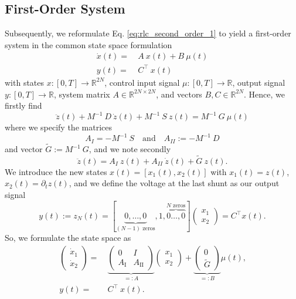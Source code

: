
\subsection{First-Order System}
Subsequently, we reformulate Eq. \eqref{eq:rlc_second_order_1} to yield a first-order system in the common state space formulation
\begin{align*}
	\dot{x}(t) =&~ A~ x(t) + B~\mu(t)\\
	y(t) =&~ C^\top~x(t)
\end{align*}
with states $x:[0,T]\rightarrow \mathbb{R}^{2N}$, control input signal $\mu:[0,T]\rightarrow \mathbb{R}$, output signal $y:[0,T]\rightarrow \mathbb{R}$, system matrix $A \in \mathbb{R}^{2N\times2N}$, and vectors $B, C \in \mathbb{R}^{2N}$. Hence, we firstly find
\begin{equation}
	\ddot{z}(t) + M^{-1}~D ~ \dot{z}(t) + M^{-1}~S ~ z(t) = M^{-1}~G ~ \mu(t)	 \label{eq:rlc_second_order_2}
\end{equation}
where we specify the matrices 
\begin{equation}
	A_{I} = -M^{-1}~S \quad \text{and} \quad A_{II} := -M^{-1}~D	\label{eq:first_order_submatrices}
\end{equation}
and vector $\tilde{G}:= M^{-1}~G$, and we note secondly 
\begin{equation*}
	\ddot{z}(t) = A_{I} ~ z(t)  + A_{II} ~ \dot{z}(t) + \tilde{G} ~ z(t) \text{.}
\end{equation*}
We introduce the new states $x(t) = \left[x_{1}(t),x_{2}(t)\right]$ with $x_{1}(t) = z(t)$, $x_{2}(t) = \partial_{t} z(t)$, and we define the voltage at the last shunt as our output signal 
\begin{equation}
	y(t) := z_{N}(t) = \left[\underbrace{0,\ldots,0}_{(N-1)\text{ zeros}},1,\overbrace{0\ldots,0}^{N \text{ zeros}}\right] 	\begin{pmatrix}
		{x}_{1} \\	
		{x}_{2}
	\end{pmatrix} = C^{\top} x(t) \text{.} 
\end{equation}
So, we formulate the state space as 
\begin{subequations}
\begin{align}
	\begin{pmatrix}
		\dot{x}_{1} \\	
		\dot{x}_{2}
	\end{pmatrix}
	=&~
	\underbrace{
		\begin{pmatrix}
			0 & I \\
			A_{\mathrm{I}} & A_{\mathrm{II}}
		\end{pmatrix}
	}_{=: A}
	\begin{pmatrix}
		{x}_{1} \\	
		{x}_{2}
	\end{pmatrix}
	+
	\underbrace{
		\begin{pmatrix}
			0  \\
			\tilde{G}
		\end{pmatrix}
	}_{=: B}
	\mu(t) \label{eq:state_space1}
	\text{,} \\
	y(t) =&~ C^\top ~ x(t) \text{.} \label{eq:state_space2}
\end{align}
\end{subequations}

